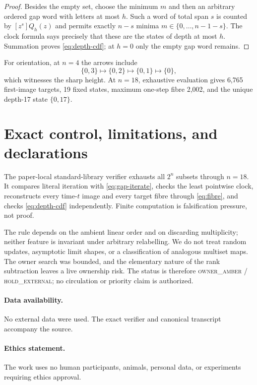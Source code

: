 \documentclass[a4paper,10pt]{amsart}
\theoremstyle{remark}
\begin{document}
\begin{proof}
Besides the empty set, choose the minimum $m$ and then an arbitrary ordered
gap word with letters at most $h$.  Such a word of total span $s$ is counted
by $[z^s]Q_h(z)$ and permits exactly $n-s$ minima
$m\in\{0,\ldots,n-1-s\}$.  The clock formula says precisely that these are
the states of depth at most $h$.  Summation proves \eqref{eq:depth-cdf}; at
$h=0$ only the empty gap word remains.
\end{proof}

For orientation, at $n=4$ the arrows include
\begin{equation*}
 \{0,3\}\longmapsto\{0,2\}\longmapsto\{0,1\}
 \longmapsto\{0\},
\end{equation*}
which witnesses the sharp height.  At $n=18$, exhaustive evaluation gives
6,765 first-image targets, 19 fixed states, maximum one-step fibre 2,002,
and the unique depth-17 state $\{0,17\}$.

\section{Exact control, limitations, and declarations}

The paper-local standard-library verifier exhausts all $2^n$ subsets through
$n=18$.  It compares literal iteration with \eqref{eq:gap-iterate}, checks
the least pointwise clock, reconstructs every time-$t$ image and every target
fibre through \eqref{eq:fibre}, and checks \eqref{eq:depth-cdf} independently.
Finite computation is falsification pressure, not proof.

The rule depends on the ambient linear order and on discarding multiplicity;
neither feature is invariant under arbitrary relabelling.  We do not treat
random updates, asymptotic limit shapes, or a classification of analogous
multiset maps.  The owner search was bounded, and the elementary nature of
the rank subtraction leaves a live ownership risk.  The status is therefore
\textsc{owner\_amber / hold\_external}; no circulation or priority claim is
authorized.

\paragraph{Data availability.}
No external data were used.  The exact verifier and canonical transcript
accompany the source.
\paragraph{Ethics statement.}
The work uses no human participants, animals, personal data, or experiments
requiring ethics approval.
\end{document}
